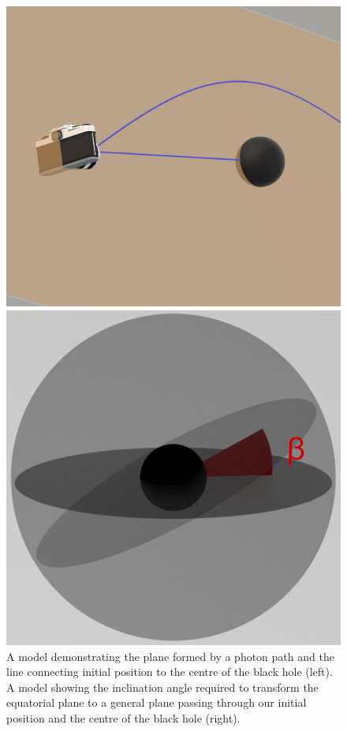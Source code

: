 \documentclass[oneside,openright,frontopenright, singlespacing]{dmathesis}
\begin{document}
\begin{figure}[!ht]
	\centering
	\begin{minipage}{0.5\textwidth}
		\centering
		\includegraphics[width=0.8\linewidth]{img/plane}
	\end{minipage}%
	\hfill
	\begin{minipage}{0.5\textwidth}
		\centering
		\includegraphics[width=0.72\linewidth]{img/inclinationfigure}
	\end{minipage}
	\caption{A model demonstrating the plane formed by a photon path and the line connecting initial position to the centre of the black hole (left). A model showing the inclination angle required to transform the equatorial plane to a general plane passing through our initial position and the centre of the black hole (right).}
	\label{fig:Figure3.2}
\end{figure}
\end{document}
